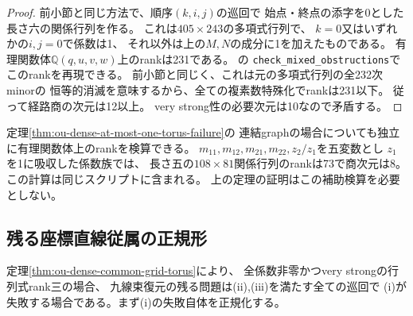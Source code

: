 \begin{proof}
前小節と同じ方法で、順序$(k,i,j)$の巡回で
始点・終点の添字を0とした長さ六の関係行列を作る。
これは$405\times243$の多項式行列で、
$k=0$又はいずれかの$i,j=0$で係数は1、
それ以外は上の$M,N$の成分に1を加えたものである。
有理関数体$\mathbb Q(q,u,v,w)$上のrankは231である。
の
\texttt{check\_mixed\_obstructions}でこのrankを再現できる。
前小節と同じく、これは元の多項式行列の全232次minorの
恒等的消滅を意味するから、全ての複素数特殊化でrankは231以下。
従って経路商の次元は12以上。
very strong性の必要次元は10なので矛盾する。
\end{proof}

\begin{remark}
定理\ref{thm:ou-dense-at-most-one-torus-failure}の
連結graphの場合についても独立に有理関数体上のrankを検算できる。
$m_{11},m_{12},m_{21},m_{22},z_2/z_1$を五変数とし
$z_1$を1に吸収した係数族では、
長さ五の$108\times81$関係行列のrankは73で商次元は8。
この計算は同じスクリプトに含まれる。
上の定理の証明はこの補助検算を必要としない。
\end{remark}

\subsection{残る座標直線従属の正規形}
\label{subsec:ou-dense-dependent-coordinate}

定理\ref{thm:ou-dense-common-grid-torus}により、
全係数非零かつvery strongの行列式rank三の場合、
九線束復元の残る問題は(ii),(iii)を満たす全ての巡回で
(i)が失敗する場合である。まず(i)の失敗自体を正規化する。


